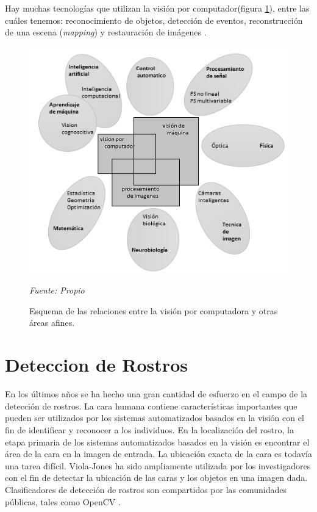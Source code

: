 Hay muchas tecnologías que utilizan la visión por computador(figura \ref{fig:esquema_vision_computador}), entre las cuáles tenemos: reconocimiento de objetos, detección de eventos, reconstrucción de una escena (\textit{mapping}) y restauración de imágenes \cite{15VC}.


\begin{figure}[H]
		\centering
		\includegraphics[width=120mm]{./Imagenes/esquema_vision_computador.png}
		\caption{Esquema de las relaciones entre la visión por computadora y otras áreas afines.}
		\vspace{0.15cm}
		\textit{Fuente: Propio}
		\label{fig:esquema_vision_computador}
\end{figure}  


\section{Deteccion de Rostros}
En los últimos años se ha hecho una gran cantidad de esfuerzo en el campo de la detección de rostros. La cara humana contiene características importantes que pueden ser utilizados por los sistemas automatizados basados en la visión con el fin de identificar y reconocer a los individuos. En la localización del rostro, la etapa primaria de los sistemas automatizados basados en la visión es encontrar el área de la cara en la imagen de
entrada. La ubicación exacta de la cara es todavía una tarea difícil. Viola-Jones ha sido ampliamente utilizada por los investigadores con el fin de detectar la ubicación de las caras y los objetos en una imagen dada. Clasificadores de detección de rostros son compartidos por las comunidades públicas, tales como OpenCV \cite{20padilla2012evaluation}.

